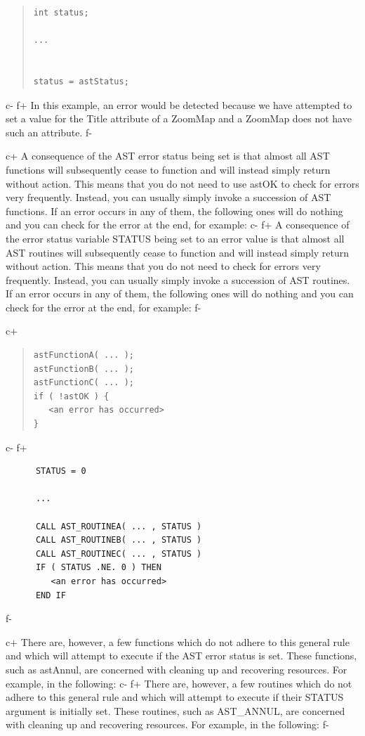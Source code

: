 \documentclass[twoside,11pt]{article}
\begin{document}
\begin{quote}
\small
\begin{verbatim}
int status;

...


status = astStatus;
\end{verbatim}
\normalsize
\end{quote}
c-
f+
In this example, an error would be detected because we have attempted
to set a value for the Title attribute of a ZoomMap and a ZoomMap does
not have such an attribute.
f-

c+
A consequence of the AST error status being set is that almost all AST
functions will subsequently cease to function and will instead simply
return without action.  This means that you do not need to use astOK
to check for errors very frequently. Instead, you can usually simply
invoke a succession of AST functions. If an error occurs in any of
them, the following ones will do nothing and you can check for the
error at the end, for example:
c-
f+
A consequence of the error status variable STATUS being set to an
error value is that almost all AST routines will subsequently cease to
function and will instead simply return without action.  This means
that you do not need to check for errors very frequently. Instead, you
can usually simply invoke a succession of AST routines. If an error
occurs in any of them, the following ones will do nothing and you can
check for the error at the end, for example:
f-

c+
\begin{quote}
\small
\begin{verbatim}
astFunctionA( ... );
astFunctionB( ... );
astFunctionC( ... );
if ( !astOK ) {
   <an error has occurred>
}
\end{verbatim}
\normalsize
\end{quote}
c-
f+
\small
\begin{verbatim}
      STATUS = 0

      ...

      CALL AST_ROUTINEA( ... , STATUS )
      CALL AST_ROUTINEB( ... , STATUS )
      CALL AST_ROUTINEC( ... , STATUS )
      IF ( STATUS .NE. 0 ) THEN
         <an error has occurred>
      END IF
\end{verbatim}
\normalsize
f-

c+
There are, however, a few functions which do not adhere to this
general rule and which will attempt to execute if the AST error status
is set. These functions, such as astAnnul, are concerned with cleaning
up and recovering resources. For example, in the following:
c-
f+
There are, however, a few routines which do not adhere to this general
rule and which will attempt to execute if their STATUS argument is
initially set.  These routines, such as AST\_ANNUL, are concerned with
cleaning up and recovering resources. For example, in the following:
f-
\end{document}
